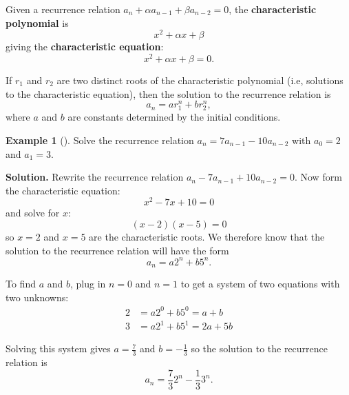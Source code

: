 \documentclass[12pt,]{book}
\newcommand{\terminology}[1]{\textbf{#1}}
\theoremstyle{plain}
\theoremstyle{definition}
\theoremstyle{definition}
\newtheorem{example}[theorem]{Example}
\theoremstyle{definition}
\numberwithin{equation}{chapter}
\newcommand{\amp}{&}
\begin{document}
\begin{assemblage}\label{assemblage-6}
\hypertarget{p-324}{}%
 Given a recurrence relation \(a_n + \alpha a_{n-1} + \beta a_{n-2} = 0\), the \terminology{characteristic polynomial} is%
\begin{equation*}
x^2 + \alpha x + \beta
\end{equation*}
giving the \terminology{characteristic equation}:%
\begin{equation*}
x^2 + \alpha x + \beta = 0.
\end{equation*}
%
\par
\hypertarget{p-325}{}%
If \(r_1\) and \(r_2\) are two distinct roots of the characteristic polynomial (i.e, solutions to the characteristic equation), then the solution to the recurrence relation is%
\begin{equation*}
a_n = ar_1^n + br_2^n,
\end{equation*}
where \(a\) and \(b\) are constants determined by the initial conditions.%
\end{assemblage}
\begin{example}[]\label{example-23}
\hypertarget{p-326}{}%
Solve the recurrence relation \(a_n = 7a_{n-1} - 10 a_{n-2}\) with \(a_0 = 2\) and \(a_1 = 3\).%
\par\smallskip%
\noindent\textbf{Solution.}\hypertarget{solution-37}{}\quad%
\hypertarget{p-327}{}%
Rewrite the recurrence relation \(a_n - 7a_{n-1} + 10a_{n-2} = 0\). Now form the characteristic equation:%
\begin{equation*}
x^2 - 7x + 10 = 0
\end{equation*}
and solve for \(x\):%
\begin{equation*}
(x - 2) (x - 5) = 0
\end{equation*}
so \(x = 2\) and \(x = 5\) are the characteristic roots. We therefore know that the solution to the recurrence relation will have the form%
\begin{equation*}
a_n = a 2^n + b 5^n.
\end{equation*}
%
\par
\hypertarget{p-328}{}%
To find \(a\) and \(b\), plug in \(n =0\) and \(n = 1\) to get a system of two equations with two unknowns:%
\begin{align*}
2 \amp = a 2^0 + b 5^0 = a + b\\
3 \amp = a 2^1 + b 5^1 = 2a + 5b
\end{align*}
%
\par
\hypertarget{p-329}{}%
Solving this system gives \(a = \frac{7}{3}\) and \(b = -\frac{1}{3}\) so the solution to the recurrence relation is%
\begin{equation*}
a_n = \frac{7}{3}2^n - \frac{1}{3} 3^n.
\end{equation*}
%
\end{example}
\end{document}
